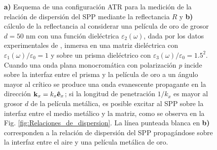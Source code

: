 \begin{figure}[h!]
\begin{subfigure}{.45\linewidth}
\vspace*{-.5em}	
	
	\end{subfigure}\hfill	\vspace*{-.5em}
	\caption{\textbf{a)} Esquema de una configuración ATR para la medición de la relación de dispersión del SPP mediante la reflectancia $R$ y \textbf{b)}  cálculo de la reflectancia al considerar una película de oro de grosor $d=50$ nm con una función dieléctrica $\varepsilon_2(\omega)$, dada por los datos experimentales de \cite{johnson1972constants}, inmersa en una matriz dieléctrica con $\varepsilon_1(\omega)/\varepsilon_0 = 1$ y sobre un prisma dieléctrico con $\varepsilon_3(\omega)/\varepsilon_0=1.5^2$. Cuando una onda plana monocromática con polarización \emph{p} incide sobre la interfaz entre el prisma y la película de oro a un ángulo mayor al crítico se produce una onda evanescente propagante en la dirección $\vb{k}_x=k_x\vu{e}_x$; si la longitud de penetración $1/k_x$ es mayor al grosor $d$ de la película metálica, es posible excitar al SPP sobre la interfaz entre el medio metálico y la matriz, como se observa en la Fig. \ref{fig:Relaciones_de_dispersion}. La línea punteada blanca en \textbf{b)} corresponden a la relación de dispersión del SPP propagándose sobre la interfaz entre el aire y una película metálica de oro.}\label{fig:ATR-SPP}
	\end{figure}			
		
